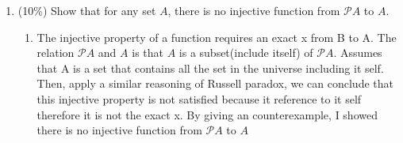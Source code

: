 \documentclass[10pt]{article}
\begin{document}
\begin{enumerate}
\begin{enumerate}
  \item (10\%) Show that for any set $A$, there is no injective function from $\mathscr{P} A$ to $A$.
  \begin{enumerate}
    \item The injective property of a function requires an exact x from B to A. The relation $\mathscr{P} A$ and $A$ is that $A$ is a subset(include itself) of $\mathscr{P} A$. Assumes that A is a set that contains all the set in the universe including it self. Then, apply a similar reasoning of Russell paradox, we can conclude that this injective property is not satisfied because it reference to it self therefore it is not the exact x. By giving an counterexample, I showed there is no injective function from $\mathscr{P} A$ to $A$
  \end{enumerate}


\end{enumerate}
\end{enumerate}
\end{document}
